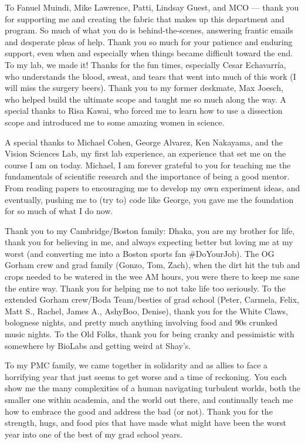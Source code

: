 To Fanuel Muindi, Mike Lawrence, Patti, Lindsay Guest, and MCO --- thank you for supporting me and creating the fabric that makes up this department and program. So much of what you do is behind-the-scenes, answering frantic emails and desperate pleas of help. Thank you so much for your patience and enduring support, even when and especially when things became difficult toward the end. To my lab, we made it! Thanks for the fun times, especially Cesar Echavarr\'{i}a, who understands the blood, sweat, and tears that went into much of this work (I will miss the surgery beers). Thank you to my former deskmate, Max Joesch, who helped build the ultimate scope and taught me so much along the way. A special thanks to Risa Kawai, who forced me to learn how to use a dissection scope and introduced me to some amazing women in science. 

A special thanks to Michael Cohen, George Alvarez, Ken Nakayama, and the Vision Sciences Lab, my first lab experience, an experience that set me on the course I am on today. Michael, I am forever grateful to you for teaching me the fundamentals of scientific research and the importance of being a good mentor. From reading papers to encouraging me to develop my own experiment ideas, and eventually, pushing me to (try to) code like George, you gave me the foundation for so much of what I do now.

Thank you to my Cambridge/Boston family:  Dhaka, you are my brother for life, thank you for believing in me, and always expecting better but loving me at my worst (and converting me into a Boston sports fan \#DoYourJob). The OG Gorham crew and grad family (Gonzo, Tom, Zach), when the dirt hit the tub and crops needed to be watered in the wee AM hours, you were there to keep me sane the entire way. Thank you for helping me to not take life too seriously. To the extended Gorham crew/Boda Team/besties of grad school (Peter, Carmela, Felix, Matt S., Rachel, James A., AshyBoo, Denise), thank you for the White Claws, bolognese nights, and pretty much anything involving food and 90s crunked music nights. To the Old Folks, thank you for being cranky and pessimistic with somewhere by BioLabs and getting weird at Shay's. 

To my PMC family, we came together in solidarity and as allies to face a horrifying year that just seems to get worse and a time of reckoning. You each show me the many complexities of a human navigating turbulent worlds, both the smaller one within academia, and the world out there, and continually teach me how to embrace the good and address the bad (or not). Thank you for the strength, hugs, and food pics that have made what might have been the worst year into one of the best of my grad school years. 

